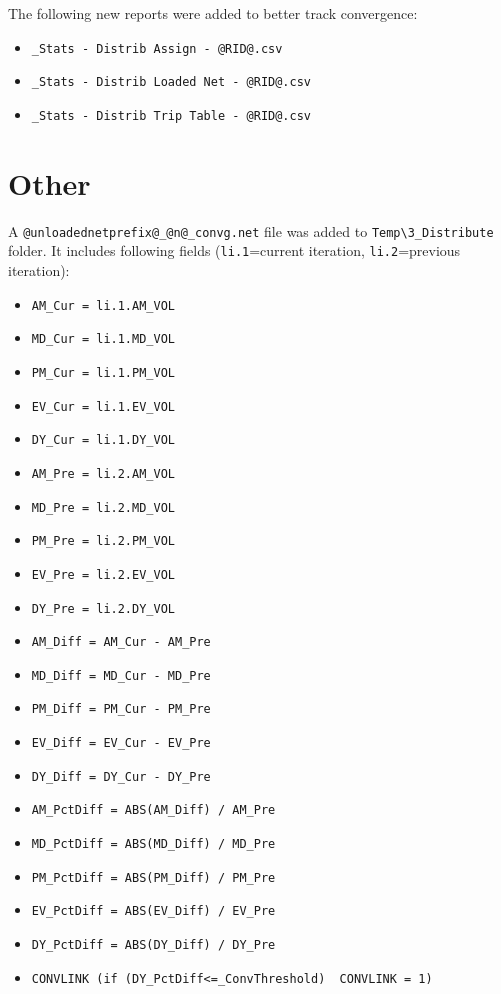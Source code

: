 \documentclass[
  letterpaper,
  DIV=11,
  numbers=noendperiod,
  titlepage=false]{scrreprt}
\providecommand{\tightlist}{%
  \setlength{\itemsep}{0pt}\setlength{\parskip}{0pt}}\usepackage{longtable,booktabs,array}
\begin{document}
The following new reports were added to better track convergence:

\begin{itemize}
\tightlist
\item
  \texttt{\_Stats\ -\ Distrib\ Assign\ -\ @RID@.csv}
\item
  \texttt{\_Stats\ -\ Distrib\ Loaded\ Net\ -\ @RID@.csv}
\item
  \texttt{\_Stats\ -\ Distrib\ Trip\ Table\ -\ @RID@.csv}
\end{itemize}

\hypertarget{other}{%
\section{Other}\label{other}}

A \texttt{@unloadednetprefix@\_@n@\_convg.net} file was added to
\texttt{Temp\textbackslash{}3\_Distribute} folder. It includes following
fields (\texttt{li.1}=current iteration, \texttt{li.2}=previous
iteration):

\begin{itemize}
\tightlist
\item
  \texttt{AM\_Cur\ =\ li.1.AM\_VOL}
\item
  \texttt{MD\_Cur\ =\ li.1.MD\_VOL}
\item
  \texttt{PM\_Cur\ =\ li.1.PM\_VOL}
\item
  \texttt{EV\_Cur\ =\ li.1.EV\_VOL}
\item
  \texttt{DY\_Cur\ =\ li.1.DY\_VOL}
\item
  \texttt{AM\_Pre\ =\ li.2.AM\_VOL}
\item
  \texttt{MD\_Pre\ =\ li.2.MD\_VOL}
\item
  \texttt{PM\_Pre\ =\ li.2.PM\_VOL}
\item
  \texttt{EV\_Pre\ =\ li.2.EV\_VOL}
\item
  \texttt{DY\_Pre\ =\ li.2.DY\_VOL}
\item
  \texttt{AM\_Diff\ =\ AM\_Cur\ -\ AM\_Pre}
\item
  \texttt{MD\_Diff\ =\ MD\_Cur\ -\ MD\_Pre}
\item
  \texttt{PM\_Diff\ =\ PM\_Cur\ -\ PM\_Pre}
\item
  \texttt{EV\_Diff\ =\ EV\_Cur\ -\ EV\_Pre}
\item
  \texttt{DY\_Diff\ =\ DY\_Cur\ -\ DY\_Pre}
\item
  \texttt{AM\_PctDiff\ =\ ABS(AM\_Diff)\ /\ AM\_Pre}
\item
  \texttt{MD\_PctDiff\ =\ ABS(MD\_Diff)\ /\ MD\_Pre}
\item
  \texttt{PM\_PctDiff\ =\ ABS(PM\_Diff)\ /\ PM\_Pre}
\item
  \texttt{EV\_PctDiff\ =\ ABS(EV\_Diff)\ /\ EV\_Pre}
\item
  \texttt{DY\_PctDiff\ =\ ABS(DY\_Diff)\ /\ DY\_Pre}
\item
  \texttt{CONVLINK\ (if\ (DY\_PctDiff\textless{}=\_ConvThreshold)\ \ CONVLINK\ =\ 1)}
\end{itemize}
\end{document}
